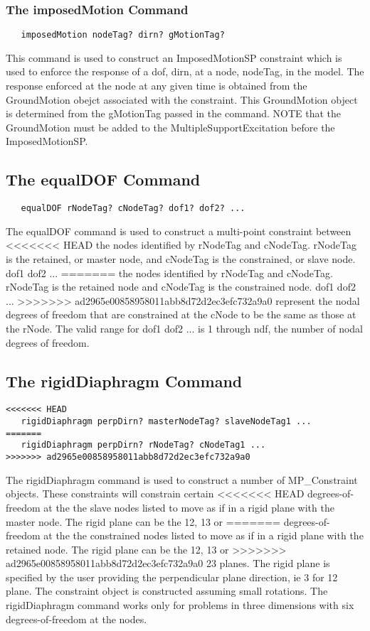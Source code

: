 \documentclass[12pt]{article}
\begin{document}
\subsubsection{The imposedMotion Command}
{\sf\small
\begin{verbatim}
   imposedMotion nodeTag? dirn? gMotionTag? 
\end{verbatim}
}

This command is used to construct an ImposedMotionSP constraint which
is used to enforce the response of a dof, dirn, at a node, nodeTag, in
the model. The response enforced at the node at any given time is
obtained from the GroundMotion obejct associated with the
constraint. This GroundMotion object is determined from the gMotionTag
passed in the command. NOTE that the GroundMotion must be added to the
MultipleSupportExcitation before the ImposedMotionSP. 


\subsection{The equalDOF Command}
{\sf\small
\begin{verbatim}
   equalDOF rNodeTag? cNodeTag? dof1? dof2? ...
\end{verbatim}
}

The equalDOF command is used to construct a multi-point constraint between
<<<<<<< HEAD
the nodes identified by rNodeTag and cNodeTag. rNodeTag is the retained, or
master node, and cNodeTag is the constrained, or slave node. dof1 dof2 ... 
=======
the nodes identified by rNodeTag and cNodeTag. rNodeTag is the retained node
and cNodeTag is the constrained node. dof1 dof2 ... 
>>>>>>> ad2965e00858958011abb8d72d2ec3efc732a9a0
represent the nodal degrees of freedom that are constrained at the cNode to
be the same as those at the rNode. The valid range for dof1 dof2 ... is 1
through ndf, the number of nodal degrees of freedom.

\subsection{The rigidDiaphragm Command}
{\sf\small
\begin{verbatim}
<<<<<<< HEAD
   rigidDiaphragm perpDirn? masterNodeTag? slaveNodeTag1 ...
=======
   rigidDiaphragm perpDirn? rNodeTag? cNodeTag1 ...
>>>>>>> ad2965e00858958011abb8d72d2ec3efc732a9a0
\end{verbatim}
}

The rigidDiaphragm command is used to construct a number of
MP\_Constraint objects. These constraints will constrain certain
<<<<<<< HEAD
degrees-of-freedom at the the slave nodes listed to move as if in a
rigid plane with the master node. The rigid plane can be the 12, 13 or
=======
degrees-of-freedom at the the constrained nodes listed to move as if in a
rigid plane with the retained node. The rigid plane can be the 12, 13 or
>>>>>>> ad2965e00858958011abb8d72d2ec3efc732a9a0
23 planes. The rigid plane is specified by the user providing the
perpendicular plane direction, ie 3 for 12 plane. The constraint
object is constructed assuming small rotations. The rigidDiaphragm
command works only for problems in three dimensions with six
degrees-of-freedom at the nodes. 
\end{document}
